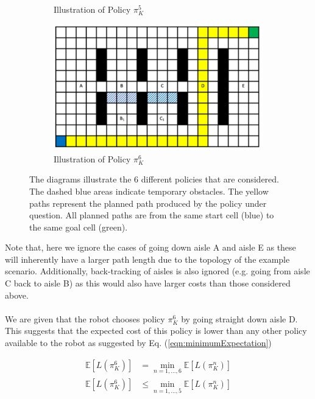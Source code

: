 \documentclass[a4paper,12pt]{article}
\begin{document}
\begin{figure}[htp]
\begin{subfigure}{.45\textwidth}
					\caption{Illustration of Policy $\pi_{K}^{5}$}
					\label{fig:policy5Diagram}
				\end{subfigure}
				\begin{subfigure}{.45\textwidth}
					\centering
					\includegraphics[width=\textwidth]{pathAisleD}
					\caption{Illustration of Policy $\pi_{K}^{6}$}
					\label{fig:policy6Diagram}
				\end{subfigure}
				\caption{The diagrams illustrate the 6 different policies that are considered. The dashed blue areas indicate temporary obstacles. The yellow paths represent the planned path produced by the policy under question. All planned paths are from the same start cell (blue) to the same goal cell (green).}
				\label{fig:policyDiagrams}
			\end{figure}
			
			Note that, here we ignore the cases of going down aisle A and aisle E as these will inherently have a larger path length due to the topology of the example scenario. Additionally, back-tracking of aisles is also ignored (e.g. going from aisle C back to aisle B) as this would also have larger costs than those considered above.
			\\
			\\
			We are given that the robot chooses policy $\pi_{K}^{6}$ by going straight down aisle D. This suggests that the expected cost of this policy is lower than any other policy available to the robot as suggested by Eq. (\ref{eqn:minimumExpectation})
			
			\begin{equation}
			\begin{split}
				\mathbb{E}\left[L\left(\pi_{K}^{6}\right)\right] &= \min_{n=1,\dots,6} \mathbb{E}\left[L\left(\pi_{K}^{n}\right)\right] \\
				\mathbb{E}\left[L\left(\pi_{K}^{6}\right)\right] &\leq \min_{n=1,\dots,5} \mathbb{E}\left[L\left(\pi_{K}^{n}\right)\right]
			\end{split}
			\label{eqn:minimumExpectation}
			\end{equation}
			
\end{document}
